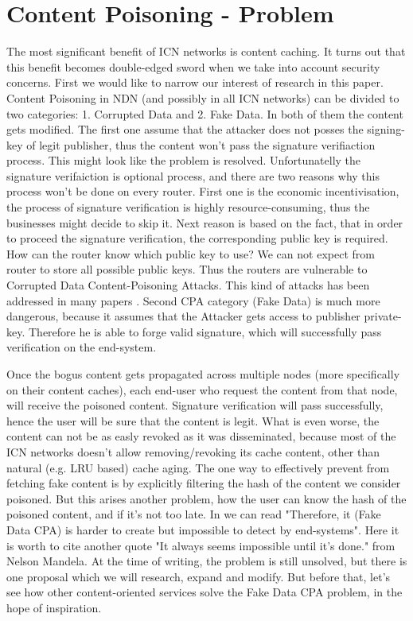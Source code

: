 \documentclass[nostrict]{szablonPG}
\begin{document}
\section{Content Poisoning - Problem}
The most significant benefit of ICN networks is content caching. It turns out that this benefit becomes double-edged sword when we take into account security concerns. 
First we would like to narrow our interest of research in this paper. Content Poisoning in NDN (and possibly in all ICN networks) can be divided to two categories: 1. Corrupted Data and 2. Fake Data. In both of them the content gets modified. The first one assume that the attacker does not posses the signing-key of legit publisher, thus the content won't pass the signature verifiaction process. This might look like the problem is resolved. Unfortunatelly the signature verifaiction is optional process, and there are two reasons why this process won't be done on every router. First one is the economic incentivisation, the process of signature verification is highly resource-consuming, thus the businesses might decide to skip it. Next reason is based on the fact, that in order to proceed the signature verification, the corresponding public key is required. How can the router know which public key to use? We can not expect from router to store all possible public keys. Thus the routers are vulnerable to Corrupted Data Content-Poisoning Attacks. This kind of attacks has been addressed in many papers \cite{ghali2014needle} \cite{yu2018content} \cite{nguyen2017content}. Second CPA category (Fake Data) is much more dangerous, because it assumes that the Attacker gets access to publisher private-key. Therefore he is able to forge valid signature, which will successfully pass verification on the end-system. 

Once the bogus content gets propagated across multiple nodes (more specifically on their content caches), each end-user who request the content from that node, will receive the poisoned content. Signature verification will pass successfully, hence the user will be sure that the content is legit. What is even worse, the content can not be as easly revoked as it was disseminated, because most of the ICN networks doesn't allow removing/revoking its cache content, other than natural (e.g. LRU based) cache aging. The one way to effectively prevent from fetching fake content is by explicitly filtering the hash of the content we consider poisoned. But this arises another problem, how the user can know the hash of the poisoned content, and if it's not too late. In \cite{nguyen2017content} we can read "Therefore, it (Fake Data CPA) is harder to create but impossible to detect by end-systems". Here it is worth to cite another quote "It always seems impossible until it's done." from Nelson Mandela. At the time of writing, the problem is still unsolved, but there is one proposal \cite{jekon2019content} which we will research, expand and modify. But before that, let's see how other content-oriented services solve the Fake Data CPA problem, in the hope of inspiration.
\end{document}
